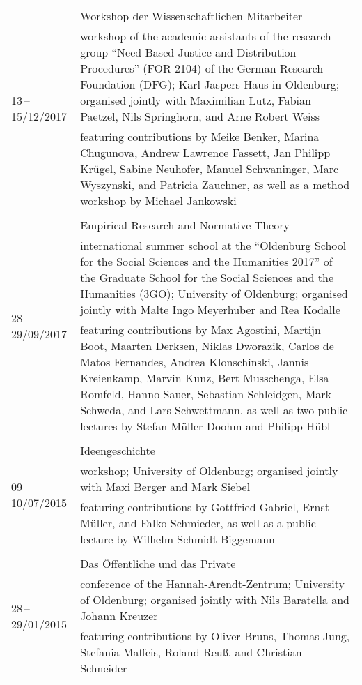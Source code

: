 \documentclass[a4paper,10pt]{article}
\begin{document}
\begin{longtable}{p{2.5cm}p{11cm}}
\\
\multirow{3}{2.5cm}{\footnotesize{13\,--\,15/12/2017}} & Workshop der Wissenschaftlichen Mitarbeiter\\
& \footnotesize{workshop of the academic assistants of the research group \enquote{Need-Based Justice and Distribution Procedures} (FOR 2104) of the German Research Foundation (DFG); Karl-Jaspers-Haus in Oldenburg; organised jointly with Maximilian Lutz, Fabian Paetzel, Nils Springhorn, and Arne Robert Weiss}\\
& \footnotesize{featuring contributions by Meike Benker, Marina Chugunova, Andrew Lawrence Fassett, Jan Philipp Krügel, Sabine Neuhofer, Manuel Schwaninger, Marc Wyszynski, and Patricia Zauchner, as well as a method workshop by Michael Jankowski}\\
\\
\multirow{3}{2.5cm}{\footnotesize{28\,--\,29/09/2017}} & Empirical Research and Normative Theory\\
& \footnotesize{international summer school at the \enquote{Oldenburg School for the Social Sciences and the Humanities 2017} of the Graduate School for the Social Sciences and the Humanities (3GO); University of Oldenburg; organised jointly with Malte Ingo Meyerhuber and Rea Kodalle}\\
& \footnotesize{featuring contributions by Max Agostini, Martijn Boot, Maarten Derksen, Niklas Dworazik, Carlos de Matos Fernandes, Andrea Klonschinski, Jannis Kreienkamp, Marvin Kunz, Bert Musschenga, Elsa Romfeld, Hanno Sauer, Sebastian Schleidgen, Mark Schweda, and Lars Schwettmann, as well as two public lectures by Stefan Müller-Doohm and Philipp Hübl}\\
\\
\multirow{3}{2.5cm}{\footnotesize{09\,--\,10/07/2015}} & Ideengeschichte\\
& \footnotesize{workshop; University of Oldenburg; organised jointly with Maxi Berger and Mark Siebel}\\
& \footnotesize{featuring contributions by Gottfried Gabriel, Ernst Müller, and Falko Schmieder, as well as a public lecture by Wilhelm Schmidt-Biggemann}\\
\\
\multirow{3}{2.5cm}{\footnotesize{28\,--\,29/01/2015}} & Das Öffentliche und das Private\\
& \footnotesize{conference of the Hannah-Arendt-Zentrum; University of Oldenburg; organised jointly with Nils Baratella and Johann Kreuzer}\\
& \footnotesize{featuring contributions by Oliver Bruns, Thomas Jung, Stefania Maffeis, Roland Reuß, and Christian Schneider}\\
\end{longtable}
\end{document}
